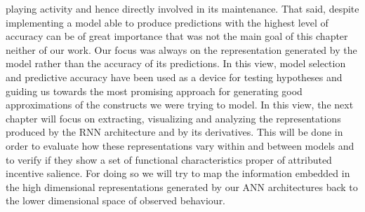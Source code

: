 playing activity \cite{westwood2010role,king2010role,king2010video,yannakakis2013player,phillips2013videogame} and hence directly involved in its maintenance. That said, despite implementing a model able to produce predictions with the highest level of accuracy can be of great importance that was not the main goal of this chapter neither of our work. Our focus was always on the representation generated by the model rather than the accuracy of its predictions. In this view, model selection and predictive accuracy have been used as a device for testing hypotheses and guiding us towards the most promising approach for generating good approximations of the constructs we were trying to model. In this view, the next chapter will focus on extracting, visualizing and analyzing the representations produced by the RNN architecture and by its derivatives. This will be done in order to evaluate how these representations vary within and between models and to verify if they show a set of functional characteristics proper of attributed incentive salience. For doing so we will try to map the information embedded in the high dimensional representations generated by our ANN architectures back to the lower dimensional space of observed behaviour. 
